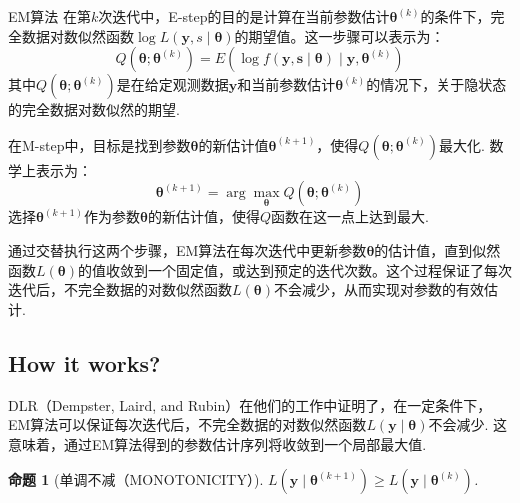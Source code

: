 \documentclass[UTF8,12pt]{ctexart}
\numberwithin{equation}{section}%
\newtheorem{prop}{命题}[section]   %
\begin{document}
	\begin{ascolorbox13}[步骤]{EM算法}
		在第$k$次迭代中，E-step的目的是计算在当前参数估计$\boldsymbol{\theta}^{(k)}$的条件下，完全数据对数似然函数$\log L(\mathbf{y}, s \mid \boldsymbol{\theta})$的期望值。这一步骤可以表示为：
		\[ Q\left(\boldsymbol{\theta} ; \boldsymbol{\theta}^{(k)}\right) = E\left(\log f(\mathbf{y}, \mathbf{s} \mid \boldsymbol{\theta}) \mid \mathbf{y}, \boldsymbol{\theta}^{(k)}\right) \]
		其中$Q(\boldsymbol{\theta}; \boldsymbol{\theta}^{(k)})$是在给定观测数据$\mathbf{y}$和当前参数估计$\boldsymbol{\theta}^{(k)}$的情况下，关于隐状态的完全数据对数似然的期望.
		
		在M-step中，目标是找到参数$\boldsymbol{\theta}$的新估计值$\boldsymbol{\theta}^{(k+1)}$，使得$Q(\boldsymbol{\theta}; \boldsymbol{\theta}^{(k)})$最大化. 数学上表示为：
		\[ \boldsymbol{\theta}^{(k+1)} = \arg \max_{\boldsymbol{\theta}} Q(\boldsymbol{\theta}; \boldsymbol{\theta}^{(k)}) \]
		选择$\boldsymbol{\theta}^{(k+1)}$作为参数$\boldsymbol{\theta}$的新估计值，使得$Q$函数在这一点上达到最大.
		
		通过交替执行这两个步骤，EM算法在每次迭代中更新参数$\boldsymbol{\theta}$的估计值，直到似然函数$L(\boldsymbol{\theta})$的值收敛到一个固定值，或达到预定的迭代次数。这个过程保证了每次迭代后，不完全数据的对数似然函数$L(\boldsymbol{\theta})$不会减少，从而实现对参数的有效估计.
	\end{ascolorbox13}
	
	

	

	
	\subsection{How it works?}
	DLR（Dempster, Laird, and Rubin）在他们的工作中证明了，在一定条件下，EM算法可以保证每次迭代后，不完全数据的对数似然函数$L(\mathbf{y}\mid \boldsymbol{\theta})$不会减少. 这意味着，通过EM算法得到的参数估计序列将收敛到一个局部最大值. 
	
	\begin{prop}[单调不减（MONOTONICITY）]\label{MONOTONICITY}
		$L(\mathbf{y}\mid \boldsymbol{\theta}^{(k+1)})\ge L(\mathbf{y}\mid \boldsymbol{\theta}^{(k)})$.
	\end{prop}
	
\end{document}
